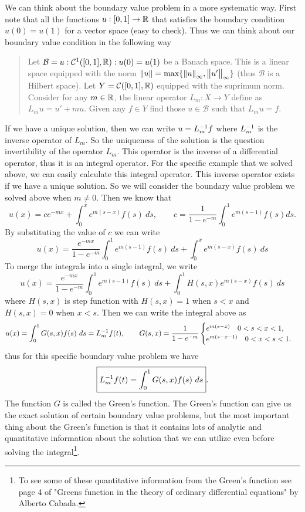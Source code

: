 We can think about the boundary value problem in a more systematic way. First note that all the functions $u:[0,1]\to\mathbb{R}$ that satisfies the boundary condition $u(0) = u(1)$ for a vector space (easy to check). Thus we can think about our boundary value condition in the following way
\begin{quote}
	Let $\mathcal{B} = {u:\mathcal{C}^1([0,1],\mathbb{R}): u(0) = u(1) }$ be a Banach space. This is a linear space equipped with the norm $\norm{u} = \max\{\norm{u}_\infty, \norm{u'}_\infty\}$ (thus $\mathcal{B}$ is a Hilbert space). Let $Y = \mathcal{C}([0,1],\mathbb{R})$ equipped with the suprimum norm. Consider for any $m\in \mathbb{R}$, the linear operator $L_m:X\to Y$ define as $L_mu =u'+mu$. Given any $f \in Y$ find those $u \in \mathcal{B}$ such that $L_m u = f.$
\end{quote}
If we have a unique solution, then we can write $u = L_m^{-1}f$ where $L_m^{-1}$ is the inverse operator of $L_m$. So the uniqueness of the solution is the question invertibility of the operator $L_m$. This operator is the inverse of a differential operator, thus it is an integral operator. For the specific example that we solved above, we can easily calculate this integral operator. This inverse operator exists if we have a unique solution. So we will consider the boundary value problem we solved above when $m \neq 0$. Then we know that 
\[ u(x) = ce^{-mx} + \int_{0}^{x} e^{m(s-x)}f(s)\ ds, \qquad c = \frac{1}{1-e^{-m}}\int_{0}^{1}e^{m(s-1)}f(s)ds.  \]
By substituting the value of $c$ we can write
\[  u(x) = \frac{e^{-mx}}{1-e^{-m}}\int_{0}^{1}e^{m(s-1)}f(s)\ ds  + \int_{0}^{x} e^{m(s-x)}f(s)\ ds \]
To merge the integrals into a single integral, we write 
\[  u(x) = \frac{e^{-mx}}{1-e^{-m}}\int_{0}^{1}e^{m(s-1)}f(s)\ ds  + \int_{0}^{1} H(s,x)e^{m(s-x)}f(s)\ ds \]
where $H(s,x)$ is step function with $H(s,x) = 1$ when $s< x$ and $H(s,x) = 0$ when $x<s$. Then we can write the integral above as
\[ u(x) = \int_{0}^{1}G(s,x)f(s)\ ds = L_m^{-1}f(t),\qquad
G(s,x) = \frac{1}{1-e^{-m}}\begin{cases}
	e^{m(s-x)} \quad 0<s< x<1, \\
	e^{m(s-x-1)} \quad 0<x<s<1.
\end{cases}
 \]
thus for this specific boundary value problem we have
\[ \boxed{L_m^{-1}f(t) = \int_{0}^{1} G(s,x) f(s)\ ds}. \] 
The function $G$ is called the Green's function. The Green's function can give us the exact solution of certain boundary value problems, but the most important thing about the Green's function is that it contains lots of analytic and quantitative information about the solution that we can utilize even before solving the integral\footnote{To see some of these quantitative information from the Green's function see page 4 of "Greens function in the theory of ordinary differential equations" by  Alberto Cabada.}.


